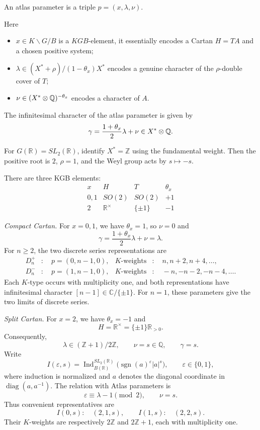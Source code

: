 
An atlas parameter is a triple $p = (x, \lambda, \nu)$.

Here 
\begin{itemize}
  \item $x \in K\backslash G / B$ is a $KGB$-element, it essentially encodes a Cartan $H = TA$ and a chosen positive system;
  \item $\lambda \in (X^* + \rho)/(1-\theta_x)X^*$ encodes a genuine character of the
$\rho$-double cover of $T$;
  \item $\nu \in (X^* \otimes \mathbb{Q})^{-\theta_x}$ encodes a character of $A$.
\end{itemize}

The infinitesimal character of the atlas parameter is given by
\[
  \gamma = \frac{1+\theta_x}{2}\lambda + \nu \in X^* \otimes \mathbb{Q}.
\]


For $G(\mathbb R)=SL_2(\mathbb R)$, identify $X^*=\mathbb Z$
using the fundamental weight. Then the positive root is $2$,
$\rho=1$, and the Weyl group acts by $s\mapsto -s$.


There are three KGB elements:
\[
\begin{array}{c|c|c|c}
x & H & T & \theta_x \\ \hline
0,1 & SO(2) & SO(2) & +1 \\
2 & \mathbb R^\times & \{\pm1\} & -1
\end{array}
\]

\emph{Compact Cartan.}
For $x=0,1$, we have $\theta_x=1$, so $\nu=0$ and
\[
\gamma=\frac{1+\theta_x}{2}\lambda+\nu=\lambda.
\]
For $n\geq 2$, the two discrete series representations are
\[
\begin{aligned}
D_n^+ &: \quad p=(0,n-1,0),
& K\text{-weights} &: \quad n,n+2,n+4,\ldots,\\
D_n^- &: \quad p=(1,n-1,0),
& K\text{-weights} &: \quad -n,-n-2,-n-4,\ldots.
\end{aligned}
\]
Each $K$-type occurs with multiplicity one, and both representations
have infinitesimal character $[n-1]\in\mathbb C/\{\pm1\}$.
For $n=1$, these parameters give the two limits of discrete series.


\emph{Split Cartan.}
For $x=2$, we have $\theta_x=-1$ and
\[
H=\mathbb R^\times=\{\pm1\}\mathbb R_{>0}.
\]
Consequently,
\[
\lambda\in(\mathbb Z+1)/2\mathbb Z,
\qquad
\nu=s\in\mathbb Q,
\qquad
\gamma=s.
\]
Write
\[
I(\varepsilon,s)
=
\operatorname{Ind}_{B(\mathbb R)}^{SL_2(\mathbb R)}
\bigl(\operatorname{sgn}(a)^\varepsilon|a|^s\bigr),
\qquad \varepsilon\in\{0,1\},
\]
where induction is normalized and $a$ denotes the diagonal coordinate
in $\operatorname{diag}(a,a^{-1})$.
The relation with Atlas parameters is
\[
\varepsilon\equiv\lambda-1\pmod2,
\qquad \nu=s.
\]
Thus convenient representatives are
\[
I(0,s):\quad (2,1,s),
\qquad
I(1,s):\quad (2,2,s).
\]
Their $K$-weights are respectively $2\mathbb Z$ and
$2\mathbb Z+1$, each with multiplicity one.



